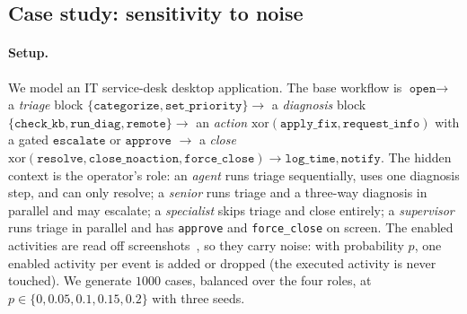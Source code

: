 \documentclass[10pt]{article}
\begin{document}
\begin{table}[t]
  \centering
  \caption{Model quality per approach, mean over the nine logs. \emph{\#mdl}\ $=$ mean number of models; \emph{fit.}\ $=$ fitness (always $1.00$); \emph{gen.}\ $=$ generalisation; \emph{simp.}\ $=$ simplicity; \emph{tr.}\ $=$ translucent. The best value in each column is in \textbf{bold} (\emph{\#mdl}\ and \emph{fit.}\ excepted).}
  \label{tab:quality}
  \footnotesize\setlength{\tabcolsep}{4pt}
  \resizebox{\linewidth}{!}{}
\end{table}

\subsection{Case study: sensitivity to noise}
\label{sec:case}

\paragraph{Setup.}
We model an IT service-desk desktop application.
The base workflow is $\texttt{open}\to$ a \emph{triage} block $\{\texttt{categorize},\texttt{set\_priority}\}\to$ a \emph{diagnosis} block $\{\texttt{check\_kb},\texttt{run\_diag},\texttt{remote}\}\to$ an \emph{action} $\mathrm{xor}(\texttt{apply\_fix},\texttt{request\_info})$ with a gated $\texttt{escalate}$ or $\texttt{approve}$ $\to$ a \emph{close} $\mathrm{xor}(\texttt{resolve},\texttt{close\_noaction},\texttt{force\_close})\to \texttt{log\_time},\texttt{notify}$.
The hidden context is the operator's role: an \emph{agent} runs triage sequentially, uses one diagnosis step, and can only resolve; a \emph{senior} runs triage and a three-way diagnosis in parallel and may escalate; a \emph{specialist} skips triage and close entirely; a \emph{supervisor} runs triage in parallel and has \texttt{approve} and \texttt{force\_close} on screen.
The enabled activities are read off screenshots~\cite{beyel2024ag}, so they carry noise: with probability $p$, one enabled activity per event is added or dropped (the executed activity is never touched).
We generate $1000$ cases, balanced over the four roles, at $p\in\{0,0.05,0.1,0.15,0.2\}$ with three seeds.
\end{document}
